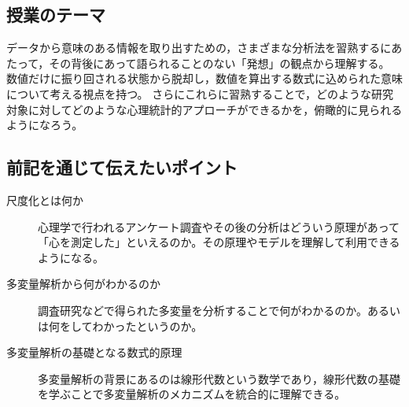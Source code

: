 \documentclass[dvipsnames]{ltjsarticle}
\begin{document}
\subsection*{授業のテーマ}
データから意味のある情報を取り出すための，さまざまな分析法を習熟するにあたって，その背後にあって語られることのない「発想」の観点から理解する。
数値だけに振り回される状態から脱却し，数値を算出する数式に込められた意味について考える視点を持つ。
さらにこれらに習熟することで，どのような研究対象に対してどのような心理統計的アプローチができるかを，俯瞰的に見られるようになろう。

\subsection*{前記を通じて伝えたいポイント}
\begin{description}
	\item[尺度化とは何か] 心理学で行われるアンケート調査やその後の分析はどういう原理があって「心を測定した」といえるのか。その原理やモデルを理解して利用できるようになる。
	\item[多変量解析から何がわかるのか] 調査研究などで得られた多変量を分析することで何がわかるのか。あるいは何をしてわかったというのか。
	\item[多変量解析の基礎となる数式的原理] 多変量解析の背景にあるのは線形代数という数学であり，線形代数の基礎を学ぶことで多変量解析のメカニズムを統合的に理解できる。
\end{description}
\end{document}
